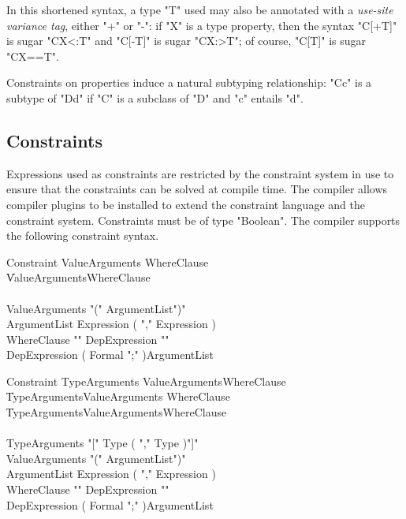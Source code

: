 \iftypeparams\else
In this shortened syntax, a type \xcd"T" used may also be annotated
with
a \emph{use-site variance tag}, either \xcd"+" or \xcd"-":
if \xcd"X" is a type property, then
the syntax \xcd"C[+T]" is sugar \xcd"C{X<:T}" and
\xcd"C[-T]" is sugar \xcd"C{X:>T}"; of course,
\xcd"C[T]" is sugar \xcd"C{X==T}".
\fi

Constraints on properties induce a natural subtyping relationship:
\xcd"C{c}" is a subtype of
\xcd"D{d}" if \xcd"C" is a subclass of \xcd"D" and
\xcd"c" entails \xcd"d".

\subsection{Constraints}

\def\withmath#1{\relax\ifmmode#1\else{$#1$}\fi}
\def\LL#1{\withmath{\lbrack\!\lbrack #1\rbrack\!\rbrack}}

Expressions used as constraints are restricted by the
constraint system in use to ensure that the constraints can
be solved at compile time.  The \Xten{} compiler allows compiler
plugins to be installed to extend the constraint language and
the
constraint system.
Constraints must be of type \xcd"Boolean".
The
compiler supports the following constraint syntax.

\iftypeparams

\begin{grammar}
Constraint \: ValueArguments     WhereClause\opt \\
           \| ValueArguments\opt WhereClause     \\
           \\
ValueArguments   \:  \xcd"(" ArgumentList\opt \xcd")" \\
ArgumentList     \:  Expression ( \xcd"," Expression )\star \\
WhereClause        \: \xcd"{" DepExpression \xcd"}" \\
DepExpression \: ( Formal \xcd";" )\star ArgumentList \\
\end{grammar}

\else

\begin{grammar}
Constraint \: TypeArguments     ValueArguments\opt WhereClause\opt \\
           \| TypeArguments\opt ValueArguments     WhereClause\opt \\
           \| TypeArguments\opt ValueArguments\opt WhereClause     \\
           \\
TypeArguments    \:  \xcd"[" Type ( \xcd"," Type )\star \xcd"]" \\
ValueArguments   \:  \xcd"(" ArgumentList\opt \xcd")" \\
ArgumentList     \:  Expression ( \xcd"," Expression )\star \\
WhereClause        \: \xcd"{" DepExpression \xcd"}" \\
DepExpression \: ( Formal \xcd";" )\star ArgumentList \\
\end{grammar}

